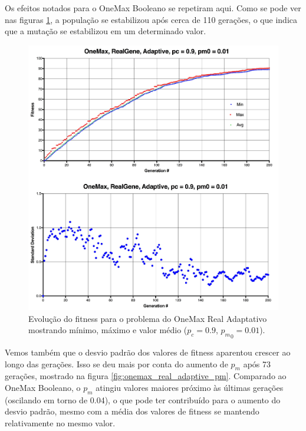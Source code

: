 Os efeitos notados para o OneMax Booleano se repetiram aqui. Como se pode ver nas figuras \ref{fig:onemax_real_adaptive}, a população se estabilizou após cerca de 110 gerações, o que indica que a mutação se estabilizou em um determinado valor.

\begin{figure}[ht!]
    \centering \includegraphics[width=1.0\textwidth]{onemax_real_adaptive.jpg}
    \caption{Evolução do fitness para o problema do OneMax Real Adaptativo mostrando mínimo, máximo e valor médio ($p_c=0.9$, ${p_m}_0=0.01$).}
    \label{fig:onemax_real_adaptive}
\end{figure}

Vemos também que o desvio padrão dos valores de fitness aparentou crescer ao longo das gerações. Isso se deu mais por conta do aumento de $p_m$ após 73 gerações, mostrado na figura \ref{fig:onemax_real_adaptive_pm}. Comparado ao OneMax Booleano, o $p_m$ atingiu valores maiores próximo às últimas gerações (oscilando em torno de 0.04), o que pode ter contribuído para o aumento do desvio padrão, mesmo com a média dos valores de fitness se mantendo relativamente no mesmo valor.

